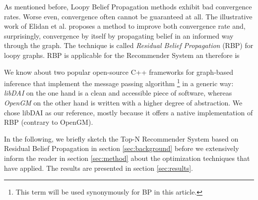 As mentioned before, Loopy Belief Propagation methods exhibit bad convergence rates. Worse even, convergence often cannot be guaranteed at all. The illustrative work of Elidan et al. \cite{elidan2012residual} proposes a method to improve both convergence rate and, surprisingly, convergence by itself by propagating belief in an informed way through the graph. The technique is called \textit{Residual Belief Propagation} (RBP) for loopy graphs. RBP is applicable for the Recommender System an therefore is 

We know about two popular open-source C++ frameworks for graph-based inference that implement the message passing algorithm \footnote{This term will be used synonymously for BP in this article.} in a generic way: \textit{libDAI} \cite{Mooij_libDAI_10} on the one hand is a clean and accessible piece of software, whereas \textit{OpenGM} \cite{andres2012opengm} on the other hand is written with a higher degree of abstraction. We chose libDAI as our reference, mostly because it offers a native implementation of RBP (contrary to OpenGM).

In the following, we briefly sketch the Top-N Recommender System based on Residual Belief Propagation in section \ref{sec:background} before we extensively inform the reader in section \ref{sec:method} about the optimization techniques that have applied. The results are presented in section \ref{sec:results}.